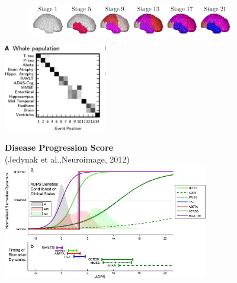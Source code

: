 \documentclass[8pt,xcolor=table]{beamer}
\begin{document}
\begin{frame}
\begin{itemize}
\begin{small}
\begin{figure}[h]
\begin{minipage}[t][\mnpHeight][t]{0.49\linewidth}
\begin{subfigure}{0.57\textwidth}
    \includegraphics[width=\textwidth,trim=450 0 0 0,clip]{young_progression2} 
    \end{subfigure}
    \includegraphics[width=0.4\textwidth]{young_positional_variance}
   \end{minipage}
   \begin{minipage}[t][\mnpHeight][t]{0.49\linewidth}
    \centering
    \textbf{Disease Progression Score}\\ \footnotesize{(Jedynak et al.,Neuroimage, 2012)}
    \includegraphics[width=0.8\textwidth,trim=0 80 0 0, clip]{dps_diagram}
   \end{minipage}


\end{figure}
\end{small}
\end{itemize}
\end{frame}
\end{document}
